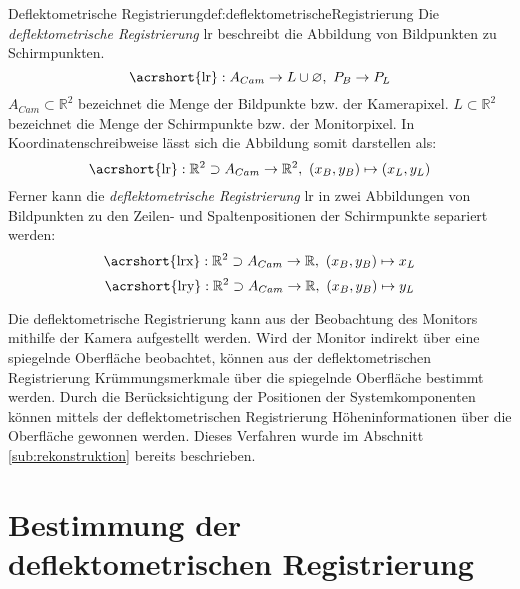 \begin{Definition}{Deflektometrische Registrierung}{def:deflektometrischeRegistrierung}
	Die \textit{deflektometrische Registrierung} \acrshort{lr} beschreibt die Abbildung von Bildpunkten zu Schirmpunkten. \cite{kit_werling}
	\begin{equation}
		\text{\acrshort{lr}} : A_{Cam} \rightarrow L \cup \varnothing ,~ P_{B} \rightarrow P_{L}
	\end{equation}
	$ A_{Cam} \subset \mathbb{R}^{2} $ bezeichnet die Menge der Bildpunkte bzw. der Kamerapixel.
	$ L \subset \mathbb{R}^{2} $ bezeichnet die Menge der Schirmpunkte bzw. der Monitorpixel.
	In Koordinatenschreibweise lässt sich die Abbildung somit darstellen als:
	\begin{equation}\label{eq:deflektometrischeRegistrierungAbbildung}
		\text{\acrshort{lr}} : \mathbb{R}^{2} \supset A_{Cam} \rightarrow \mathbb{R}^2 ,~ (x_{B}, y_{B}) \mapsto (x_{L}, y_{L})
	\end{equation}
	Ferner kann die \textit{deflektometrische Registrierung} \acrshort{lr} in zwei Abbildungen von Bildpunkten zu den Zeilen- und Spaltenpositionen der Schirmpunkte separiert werden:
	\begin{equation}
		\text{\acrshort{lrx}} : \mathbb{R}^{2} \supset A_{Cam} \rightarrow \mathbb{R} ,~ (x_{B}, y_{B}) \mapsto x_{L}
	\end{equation}
	\begin{equation}
		\text{\acrshort{lry}} : \mathbb{R}^{2} \supset A_{Cam} \rightarrow \mathbb{R} ,~ (x_{B}, y_{B}) \mapsto y_{L}
	\end{equation}
\end{Definition}

\noindent
Die deflektometrische Registrierung kann aus der Beobachtung des Monitors mithilfe der Kamera aufgestellt werden.
Wird der Monitor indirekt über eine spiegelnde Oberfläche beobachtet, können aus der deflektometrischen Registrierung Krümmungsmerkmale über die spiegelnde Oberfläche bestimmt werden.
Durch die Berücksichtigung der Positionen der Systemkomponenten können mittels der deflektometrischen Registrierung Höheninformationen über die Oberfläche gewonnen werden.
Dieses Verfahren wurde im Abschnitt \ref{sub:rekonstruktion} bereits beschrieben.

{
	\FloatBarrier
    \section{Bestimmung der deflektometrischen Registrierung}
    \label{sec:bestimmungDeflektometrischeRegistrierung}
    
}